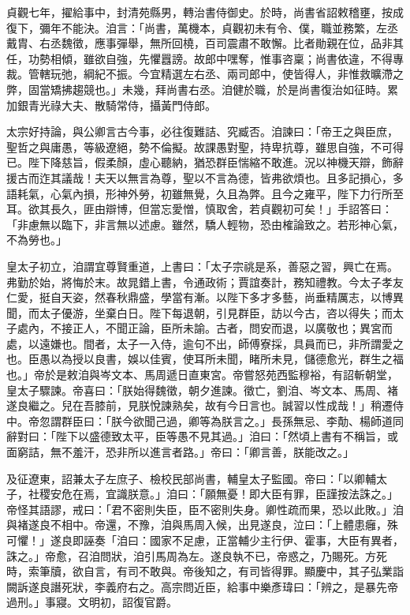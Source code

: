 \begin{pinyinscope}
 貞觀七年，擢給事中，封清苑縣男，轉治書侍御史。於時，尚書省詔敕稽壅，按成復下，彌年不能決。洎言：「尚書，萬機本，貞觀初未有令、僕，職並務繁，左丞戴胄、右丞魏徵，應事彈舉，無所回橈，百司震肅不敢懈。比者勛親在位，品非其任，功勢相傾，雖欲自強，先懼囂謗。故郎中嘿奪，惟事咨稟；尚書依違，不得專裁。管轄玩弛，綱紀不振。今宜精選左右丞、兩司郎中，使皆得人，非惟救曠滯之弊，固當矯拂趨競也。」未幾，拜尚書右丞。洎健於職，於是尚書復治如征時。累加銀青光祿大夫、散騎常侍，攝黃門侍郎。



 太宗好持論，與公卿言古今事，必往復難詰、究臧否。洎諫曰：「帝王之與臣庶，聖哲之與庸愚，等級遼絕，勢不倫擬。故課愚對聖，持卑抗尊，雖思自強，不可得已。陛下降慈旨，假柔顏，虛心聽納，猶恐群臣惴縮不敢進。況以神機天辯，飾辭援古而迮其議哉！夫天以無言為尊，聖以不言為德，皆弗欲煩也。且多記損心，多語耗氣，心氣內損，形神外勞，初雖無覺，久且為弊。且今之雍平，陛下力行所至耳。欲其長久，匪由辯博，但當忘愛憎，慎取舍，若貞觀初可矣！」手詔答曰：「非慮無以臨下，非言無以述慮。雖然，驕人輕物，恐由榷論致之。若形神心氣，不為勞也。」



 皇太子初立，洎謂宜尊賢重道，上書曰：「太子宗祧是系，善惡之習，興亡在焉。弗勤於始，將悔於末。故晁錯上書，令通政術；賈誼奏計，務知禮教。今太子孝友仁愛，挺自天姿，然春秋鼎盛，學當有漸。以陛下多才多藝，尚垂精厲志，以博異聞，而太子優游，坐棄白日。陛下每退朝，引見群臣，訪以今古，咨以得失；而太子處內，不接正人，不聞正論，臣所未諭。古者，問安而退，以廣敬也；異宮而處，以遠嫌也。間者，太子一入侍，逾句不出，師傅寮採，具員而已，非所謂愛之也。臣愚以為授以良書，娛以佳賓，使耳所未聞，睹所未見，儲德愈光，群生之福也。」帝於是敕洎與岑文本、馬周遞日直東宮。帝嘗怒苑西監穆裕，有詔斬朝堂，皇太子驟諫。帝喜曰：「朕始得魏徵，朝夕進諫。徵亡，劉洎、岑文本、馬周、褚遂良繼之。兒在吾膝前，見朕悅諫熟矣，故有今日言也。誠習以性成哉！」稍遷侍中。帝忽謂群臣曰：「朕今欲聞己過，卿等為朕言之。」長孫無忌、李勣、楊師道同辭對曰：「陛下以盛德致太平，臣等愚不見其過。」洎曰：「然頃上書有不稱旨，或面窮詰，無不羞汗，恐非所以進言者路。」帝曰：「卿言善，朕能改之。」



 及征遼東，詔兼太子左庶子、檢校民部尚書，輔皇太子監國。帝曰：「以卿輔太子，社稷安危在焉，宜識朕意。」洎曰：「願無憂！即大臣有罪，臣謹按法誅之。」帝怪其語謬，戒曰：「君不密則失臣，臣不密則失身。卿性疏而果，恐以此敗。」洎與褚遂良不相中。帝還，不豫，洎與馬周入候，出見遂良，泣曰：「上體患癰，殊可懼！」遂良即誣奏「洎曰：國家不足慮，正當輔少主行伊、霍事，大臣有異者，誅之。」帝愈，召洎問狀，洎引馬周為左。遂良執不已，帝惑之，乃賜死。方死時，索筆牘，欲自言，有司不敢與。帝後知之，有司皆得罪。顯慶中，其子弘業詣闕訴遂良譖死狀，李義府右之。高宗問近臣，給事中樂彥瑋曰：「辨之，是暴先帝過刑。」事寢。文明初，詔復官爵。




\end{pinyinscope}
